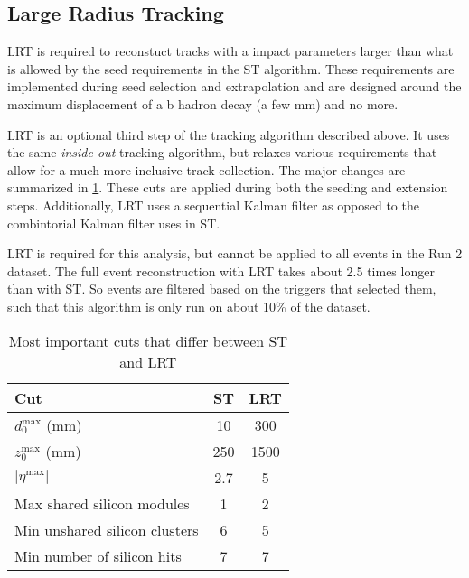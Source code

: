 \subsection{Large Radius Tracking}

\ac{LRT} is required to reconstuct tracks with a impact parameters larger than what is allowed by the seed requirements in the \ac{ST} algorithm. These requirements are implemented during seed selection and extrapolation and are designed around the maximum displacement of a b hadron decay (a few mm) and no more.

\ac{LRT} is an optional third step of the tracking algorithm described above. It uses the same \emph{inside-out} tracking algorithm, but relaxes various requirements that allow for a much more inclusive track collection. The major changes are summarized in \ref{tab:LRT}. These cuts are applied during both the seeding and extension steps. Additionally, \ac{LRT} uses a sequential Kalman filter as opposed to the combintorial Kalman filter uses in \ac{ST}.


\ac{LRT} is required for this analysis, but cannot be applied to all events in the Run 2 dataset. The full event reconstruction with \ac{LRT} takes about 2.5 times longer than with \ac{ST}. So events are filtered based on the triggers that selected them, such that this algorithm is only run on about 10\% of the dataset.


\begin{table}
\centering
\begin{tabular}{lcc}
\hline
Cut & \ac{ST} & \ac{LRT}  \\
\hline
$d_{0}^{\textrm{max}}$ (mm)   & 10   & 300 \\
$z_{0}^{\textrm{max}}$ (mm)   & 250   & 1500 \\
$ |\eta^{\textrm{max}}|$        & 2.7   & 5 \\
Max shared silicon modules    & 1     & 2 \\
Min unshared silicon clusters   & 6     & 5 \\
Min number of silicon hits   & 7     & 7 \\
\hline
\end{tabular}
\caption{Most important cuts that differ between \ac{ST} and \ac{LRT}}
\label{tab:LRT}
\end{table}


